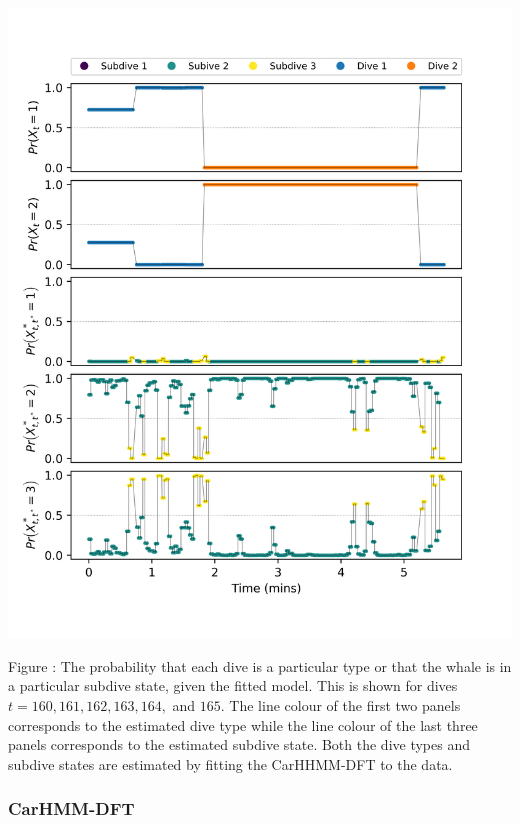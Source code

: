 \documentclass{article}
\begin{document}
        \begin{center}
        \includegraphics[width=6in]{../Plots/CarHHMM1_decoded_states.png}
        \end{center}
        
        \noindent Figure : The probability that each dive is a particular type or that the whale is in a particular subdive state, given the fitted model. This is shown for dives $t = 160,161,162,163,164,$ and $165$. The line colour of the first two panels corresponds to the estimated dive type while the line colour of the last three panels corresponds to the estimated subdive state. Both the dive types and subdive states are estimated by fitting the CarHHMM-DFT to the data.
        \addtocounter{fignum}{1}
        
        \subsubsection{CarHMM-DFT}
        
\end{document}

